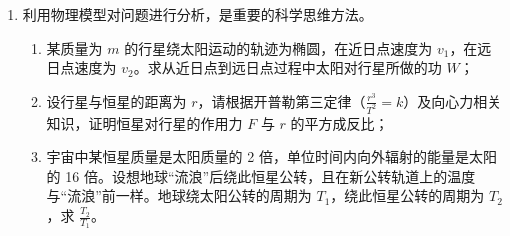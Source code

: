\documentclass[\gkver]{gaokaozhenti}
\begin{document}
\begin{enumerate}
{$q\frac{U}{2} = \frac{1}{2}mv'^{2}$

带电粒子在前 $\frac{d}{2}$ 距离做匀加速直线运动，后 $\frac{d}{2}$ 距离做匀速运动，设用时分别为 $t_{1}$、$t_{2}$，有

$\frac{d}{2} = \frac{v'}{2}t_{1}$，$\frac{d}{2} = v't_{2}$

则该粒子从 M 板运动到 N 板经历的时间

$t = t_{1} + t_{2} = \frac{3d}{2}\sqrt{\frac{m}{qU}}$
}

\item
利用物理模型对问题进行分析，是重要的科学思维方法。
\begin{enumerate}
	\item
	某质量为 $m$ 的行星绕太阳运动的轨迹为椭圆，在近日点速度为 $v_{1}$，在远日点速度为 $v_{2}$。求从近日点到远日点过程中太阳对行星所做的功 $W$；
	\item
	设行星与恒星的距离为 $r$，请根据开普勒第三定律（$\frac{r^{3}}{T^{2}} = k$）及向心力相关知识，证明恒星对行星的作用力 $F$ 与 $r$ 的平方成反比；
	\item
	宇宙中某恒星质量是太阳质量的 2 倍，单位时间内向外辐射的能量是太阳的 16 倍。设想地球“流浪”后绕此恒星公转，且在新公转轨道上的温度与“流浪”前一样。地球绕太阳公转的周期为 $T_{1}$，绕此恒星公转的周期为 $T_{2}$，求 $\frac{T_{2}}{T_{1}}$。
\end{enumerate}

\end{enumerate}
\end{document}
